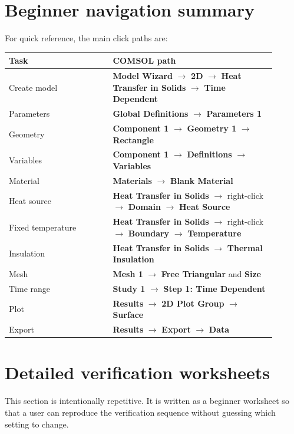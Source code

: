 \documentclass[11pt]{article}
\newcommand{\menu}[1]{\textbf{#1}}
\begin{document}
\section{Beginner navigation summary}

For quick reference, the main click paths are:
\begin{longtable}{p{0.35\linewidth}p{0.55\linewidth}}
\toprule
\textbf{Task} & \textbf{COMSOL path}\\
\midrule
Create model & \menu{Model Wizard} \(\rightarrow\) \menu{2D} \(\rightarrow\) \menu{Heat Transfer in Solids} \(\rightarrow\) \menu{Time Dependent}\\
Parameters & \menu{Global Definitions} \(\rightarrow\) \menu{Parameters 1}\\
Geometry & \menu{Component 1} \(\rightarrow\) \menu{Geometry 1} \(\rightarrow\) \menu{Rectangle}\\
Variables & \menu{Component 1} \(\rightarrow\) \menu{Definitions} \(\rightarrow\) \menu{Variables}\\
Material & \menu{Materials} \(\rightarrow\) \menu{Blank Material}\\
Heat source & \menu{Heat Transfer in Solids} \(\rightarrow\) right-click \(\rightarrow\) \menu{Domain} \(\rightarrow\) \menu{Heat Source}\\
Fixed temperature & \menu{Heat Transfer in Solids} \(\rightarrow\) right-click \(\rightarrow\) \menu{Boundary} \(\rightarrow\) \menu{Temperature}\\
Insulation & \menu{Heat Transfer in Solids} \(\rightarrow\) \menu{Thermal Insulation}\\
Mesh & \menu{Mesh 1} \(\rightarrow\) \menu{Free Triangular} and \menu{Size}\\
Time range & \menu{Study 1} \(\rightarrow\) \menu{Step 1: Time Dependent}\\
Plot & \menu{Results} \(\rightarrow\) \menu{2D Plot Group} \(\rightarrow\) \menu{Surface}\\
Export & \menu{Results} \(\rightarrow\) \menu{Export} \(\rightarrow\) \menu{Data}\\
\bottomrule
\end{longtable}


\section{Detailed verification worksheets}

This section is intentionally repetitive.  It is written as a beginner worksheet so that a user can reproduce the verification sequence without guessing which setting to change.
\end{document}
